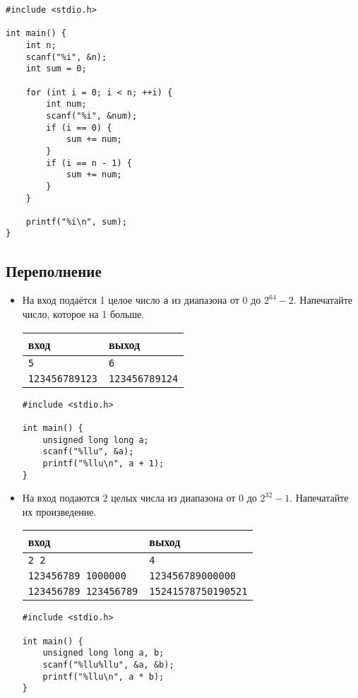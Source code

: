 \documentclass{article}
\begin{document}
\begin{itemize}
\begin{lstlisting}[backgroundcolor = \color{solcolor}]
#include <stdio.h>

int main() {
    int n; 
    scanf("%i", &n);
    int sum = 0;
    
    for (int i = 0; i < n; ++i) {
        int num;
        scanf("%i", &num);
        if (i == 0) {
            sum += num;
        }
        if (i == n - 1) {
            sum += num;
        }
    }
    
    printf("%i\n", sum);
}
\end{lstlisting}
\end{itemize}

\subsection*{Переполнение}
\begin{itemize}
\item На вход подаётся 1 целое число \texttt{a} из диапазона от $0$ до $2^{64} - 2$. Напечатайте число, которое на 1 больше.
\begin{center}
\begin{tabular}{ l | l }
 вход & выход \\ \hline
 \texttt{5} & \texttt{6}  \\ \hline
 \texttt{123456789123} & \texttt{123456789124}  \\ 
\end{tabular}
\end{center}
\begin{lstlisting}[backgroundcolor = \color{solcolor}]
#include <stdio.h>

int main() {
    unsigned long long a;
    scanf("%llu", &a);
    printf("%llu\n", a + 1);
}
\end{lstlisting}
\item На вход подаются 2 целых числа из диапазона от $0$ до $2^{32} - 1$. Напечатайте их произведение.
\begin{center}
\begin{tabular}{ l | l }
 вход & выход \\ \hline
 \texttt{2 2} & \texttt{4}  \\ \hline
  \texttt{123456789 1000000} & \texttt{123456789000000}  \\ \hline
 \texttt{123456789 123456789} & \texttt{15241578750190521}  \\ 
\end{tabular}
\end{center}
\begin{lstlisting}[backgroundcolor = \color{solcolor}]
#include <stdio.h>

int main() {
    unsigned long long a, b;
    scanf("%llu%llu", &a, &b);
    printf("%llu\n", a * b);
}
\end{lstlisting}
\end{itemize}
\end{document}

